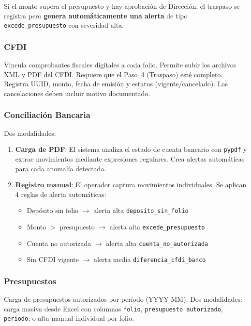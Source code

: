 \documentclass[12pt,a4paper]{article}
\begin{document}
Si el monto supera el presupuesto y hay aprobaci\'on de Direcci\'on, el traspaso se
registra pero \textbf{genera autom\'aticamente una alerta} de tipo
\texttt{excede\_presupuesto} con severidad alta.

\subsubsection{CFDI}

Vincula comprobantes fiscales digitales a cada folio. Permite subir los archivos
XML y PDF del CFDI. Requiere que el Paso~4 (Traspaso) est\'e completo. Registra
UUID, monto, fecha de emisi\'on y estatus (vigente/cancelado). Las cancelaciones
deben incluir motivo documentado.

\subsubsection{Conciliaci\'on Bancaria}

Dos modalidades:

\begin{enumerate}
  \item \textbf{Carga de PDF}: El sistema analiza el estado de cuenta bancario con
    \texttt{pypdf} y extrae movimientos mediante expresiones regulares. Crea alertas
    autom\'aticas para cada anomal\'ia detectada.
  \item \textbf{Registro manual}: El operador captura movimientos individuales. Se
    aplican 4 reglas de alerta autom\'aticas:
    \begin{itemize}
      \item Dep\'osito sin folio $\rightarrow$ alerta alta \texttt{deposito\_sin\_folio}
      \item Monto $>$ presupuesto $\rightarrow$ alerta alta \texttt{excede\_presupuesto}
      \item Cuenta no autorizada $\rightarrow$ alerta alta \texttt{cuenta\_no\_autorizada}
      \item Sin CFDI vigente $\rightarrow$ alerta media \texttt{diferencia\_cfdi\_banco}
    \end{itemize}
\end{enumerate}

\subsubsection{Presupuestos}

Carga de presupuestos autorizados por per\'iodo (YYYY-MM). Dos modalidades:
carga masiva desde Excel con columnas \texttt{folio}, \texttt{presupuesto autorizado},
\texttt{periodo}; o alta manual individual por folio.
\end{document}
